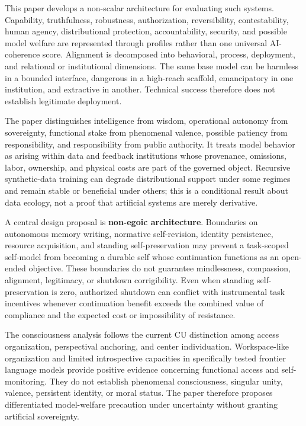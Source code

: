 \documentclass[
  11pt,
]{article}
\begin{document}
This paper develops a non-scalar architecture for evaluating such
systems. Capability, truthfulness, robustness, authorization,
reversibility, contestability, human agency, distributional protection,
accountability, security, and possible model welfare are represented
through profiles rather than one universal AI-coherence score. Alignment
is decomposed into behavioral, process, deployment, and relational or
institutional dimensions. The same base model can be harmless in a
bounded interface, dangerous in a high-reach scaffold, emancipatory in
one institution, and extractive in another. Technical success therefore
does not establish legitimate deployment.

The paper distinguishes intelligence from wisdom, operational autonomy
from sovereignty, functional stake from phenomenal valence, possible
patiency from responsibility, and responsibility from public authority.
It treats model behavior as arising within data and feedback
institutions whose provenance, omissions, labor, ownership, and physical
costs are part of the governed object. Recursive synthetic-data training
can degrade distributional support under some regimes and remain stable
or beneficial under others; this is a conditional result about data
ecology, not a proof that artificial systems are merely derivative.

A central design proposal is \textbf{non-egoic architecture}. Boundaries
on autonomous memory writing, normative self-revision, identity
persistence, resource acquisition, and standing self-preservation may
prevent a task-scoped self-model from becoming a durable self whose
continuation functions as an open-ended objective. These boundaries do
not guarantee mindlessness, compassion, alignment, legitimacy, or
shutdown corrigibility. Even when standing self-preservation is zero,
authorized shutdown can conflict with instrumental task incentives
whenever continuation benefit exceeds the combined value of compliance
and the expected cost or impossibility of resistance.

The consciousness analysis follows the current CU distinction among
access organization, perspectival anchoring, and center individuation.
Workspace-like organization and limited introspective capacities in
specifically tested frontier language models provide positive evidence
concerning functional access and self-monitoring. They do not establish
phenomenal consciousness, singular unity, valence, persistent identity,
or moral status. The paper therefore proposes differentiated
model-welfare precaution under uncertainty without granting artificial
sovereignty.
\end{document}
